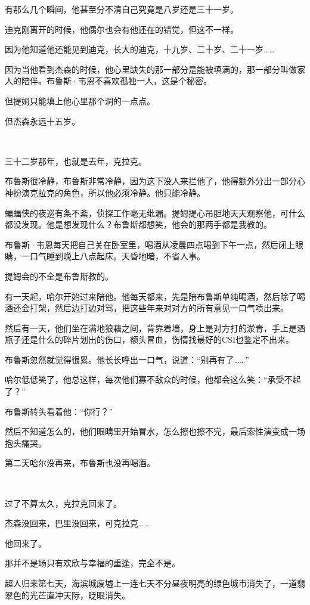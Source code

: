 \documentclass[../main]{subfiles}
\begin{document}
有那么几个瞬间，他甚至分不清自己究竟是八岁还是三十一岁。

迪克刚离开的时候，他偶尔也会有他还在的错觉，但这不一样。

因为他知道他还能见到迪克，长大的迪克，十九岁、二十岁、二十一岁……

因为当他看到杰森的时候，他心里缺失的那一部分是能被填满的，那一部分叫做家人的陪伴。布鲁斯·韦恩不喜欢孤独一人，这是个秘密。

但提姆只能填上他心里那个洞的一点点。

但杰森永远十五岁。

~\

三十二岁那年，也就是去年，克拉克。

布鲁斯很冷静，布鲁斯非常冷静，因为这下没人来拦他了，他得额外分出一部分心神扮演克拉克的角色，所以他必须冷静。他只能冷静。

蝙蝠侠的夜巡有条不紊，侦探工作毫无纰漏。提姆提心吊胆地天天观察他，可什么都没发现。他是想发现什么？布鲁斯都想笑，他会的那两手都是我教的。

布鲁斯·韦恩每天把自己关在卧室里，喝酒从凌晨四点喝到下午一点，然后闭上眼睛，一口气睡到晚上八点起床。天昏地暗，不省人事。

提姆会的不全是布鲁斯教的。

有一天起，哈尔开始过来陪他。他每天都来，先是陪布鲁斯单纯喝酒，然后除了喝酒还会打架，然后边打边对骂，把这些年来对对方的所有意见一口气喷出来。

然后有一天，他们坐在满地狼藉之间，背靠着墙，身上是对方打的淤青，手上是酒瓶子还是什么的碎片划出的伤口，额头冒血，伤情找最好的CSI也鉴定不出来。

布鲁斯忽然就觉得很累。他长长呼出一口气，说道：“别再有了……”

哈尔低低笑了，他总这样，每次他们寡不敌众的时候，他都会这么笑：“承受不起了？”

布鲁斯转头看着他：“你行？”

然后不知道怎么的，他们眼睛里开始冒水，怎么擦也擦不完，最后索性演变成一场抱头痛哭。

第二天哈尔没再来，布鲁斯也没再喝酒。

~\

过了不算太久，克拉克回来了。

杰森没回来，巴里没回来，可克拉克……

他回来了。

那并不是场只有欢欣与幸福的重逢，完全不是。

超人归来第七天，海滨城废墟上一连七天不分昼夜明亮的绿色城市消失了，一道翡翠色的光芒直冲天际，眨眼消失。
\end{document}
